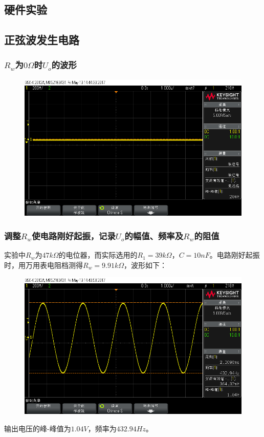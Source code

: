 \documentclass[12pt,a4paper]{article}
\begin{document}
\begin{spacing}{1.3}
\section{硬件实验}
\subsection{正弦波发生电路}
\subsubsection{$R_w$为$0\Omega$时$U_o$的波形}
\begin{figure}[H]
\centering
\includegraphics[width=\textwidth]{scope_0.png}
\end{figure}
\subsubsection{调整$R_w$使电路刚好起振，记录$U_o$的幅值、频率及$R_w$的阻值}
实验中$R_w为47k\Omega$的电位器，而实际选用的$R_1 = 39k\Omega ， C = 10nF$。电路刚好起振时，用万用表电阻档测得$R_w = 9.91k\Omega$，波形如下：
\begin{figure}[H]
\centering
\includegraphics[width=\textwidth]{scope_1.png}
\end{figure}
输出电压的峰-峰值为$1.04V$，频率为$432.94Hz$。

\end{spacing}
\end{document}
